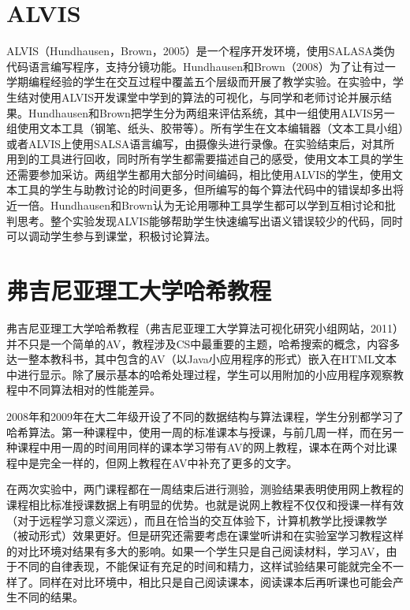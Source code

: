 \section{ALVIS}
\begin{sectext}
ALVIS（Hundhausen，Brown，2005）是一个程序开发环境，使用SALASA类伪代码语言编写程序，支持分镜功能。Hundhausen和Brown（2008）为了让有过一学期编程经验的学生在交互过程中覆盖五个层级而开展了教学实验。在实验中，学生结对使用ALVIS开发课堂中学到的算法的可视化，与同学和老师讨论并展示结果。Hundhausen和Brown把学生分为两组来评估系统，其中一组使用ALVIS另一组使用文本工具（钢笔、纸头、胶带等）。所有学生在文本编辑器（文本工具小组）或者ALVIS上使用SALSA语言编写，由摄像头进行录像。在实验结束后，对其所用到的工具进行回收，同时所有学生都需要描述自己的感受，使用文本工具的学生还需要参加采访。两组学生都用大部分时间编码，相比使用ALVIS的学生，使用文本工具的学生与助教讨论的时间更多，但所编写的每个算法代码中的错误却多出将近一倍。Hundhausen和Brown认为无论用哪种工具学生都可以学到互相讨论和批判思考。整个实验发现ALVIS能够帮助学生快速编写出语义错误较少的代码，同时可以调动学生参与到课堂，积极讨论算法。
\end{sectext}
\section{弗吉尼亚理工大学哈希教程}
\begin{sectext}
弗吉尼亚理工大学哈希教程（弗吉尼亚理工大学算法可视化研究小组网站，2011）并不只是一个简单的AV，教程涉及CS中最重要的主题，哈希搜索的概念，内容多达一整本教科书，其中包含的AV（以Java小应用程序的形式）嵌入在HTML文本中进行显示。除了展示基本的哈希处理过程，学生可以用附加的小应用程序观察教程中不同算法相对的性能差异。

2008年和2009年在大二年级开设了不同的数据结构与算法课程，学生分别都学习了哈希算法。第一种课程中，使用一周的标准课本与授课，与前几周一样，而在另一种课程中用一周的时间用同样的课本学习带有AV的网上教程，课本在两个对比课程中是完全一样的，但网上教程在AV中补充了更多的文字。

在两次实验中，两门课程都在一周结束后进行测验，测验结果表明使用网上教程的课程相比标准授课数据上有明显的优势。也就是说网上教程不仅仅和授课一样有效（对于远程学习意义深远），而且在恰当的交互体验下，计算机教学比授课教学（被动形式）效果更好。但是研究还需要考虑在课堂听讲和在实验室学习教程这样的对比环境对结果有多大的影响。如果一个学生只是自己阅读材料，学习AV，由于不同的自律表现，不能保证有充足的时间和精力，这样试验结果可能就完全不一样了。同样在对比环境中，相比只是自己阅读课本，阅读课本后再听课也可能会产生不同的结果。
\end{sectext}
